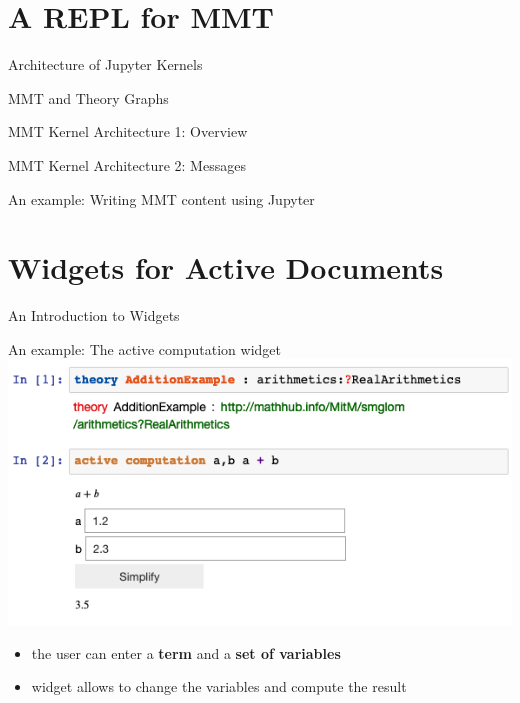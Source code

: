 \documentclass{beamer}
\begin{document}
    \section{A REPL for MMT}

    \begin{frame}{Architecture of Jupyter Kernels}
    \end{frame}

    \begin{frame}{MMT and Theory Graphs}
    \end{frame}

    \begin{frame}{MMT Kernel Architecture 1: Overview}
    \end{frame}

    \begin{frame}{MMT Kernel Architecture 2: Messages}
    \end{frame}

    \begin{frame}{An example: Writing MMT content using Jupyter}
    \end{frame}

    \section{Widgets for Active Documents}

    \begin{frame}{An Introduction to Widgets}
    \end{frame}

    \begin{frame}{An example: The active computation widget}
        \includegraphics[scale=.5]{images/activecomp}
        \begin{itemize}
            \item the user can enter a \textbf{term} and a \textbf{set of variables}
            \item widget allows to change the variables and compute the result
        \end{itemize}
    \end{frame}
\end{document}
